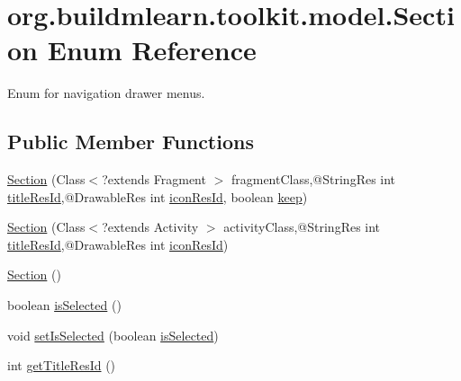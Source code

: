 \hypertarget{enumorg_1_1buildmlearn_1_1toolkit_1_1model_1_1Section}{}\section{org.\+buildmlearn.\+toolkit.\+model.\+Section Enum Reference}
\label{enumorg_1_1buildmlearn_1_1toolkit_1_1model_1_1Section}


Enum for navigation drawer menus.  


\subsection*{Public Member Functions}
\begin{DoxyCompactItemize}
\item 
\hyperlink{enumorg_1_1buildmlearn_1_1toolkit_1_1model_1_1Section_af8fb689a6421ec67519ee10df7ed87d9}{Section} (Class$<$?extends Fragment $>$ fragment\+Class,@String\+Res int \hyperlink{enumorg_1_1buildmlearn_1_1toolkit_1_1model_1_1Section_accd3e04504db3b956fb5d123ecdeca8a}{title\+Res\+Id},@Drawable\+Res int \hyperlink{enumorg_1_1buildmlearn_1_1toolkit_1_1model_1_1Section_ae100070151f5fec230914d56d01ac763}{icon\+Res\+Id}, boolean \hyperlink{enumorg_1_1buildmlearn_1_1toolkit_1_1model_1_1Section_a87db2a68da123249ea5d0dec338a2416}{keep})
\item 
\hyperlink{enumorg_1_1buildmlearn_1_1toolkit_1_1model_1_1Section_a07baca773badd3aad114bc1dbe9ac81b}{Section} (Class$<$?extends Activity $>$ activity\+Class,@String\+Res int \hyperlink{enumorg_1_1buildmlearn_1_1toolkit_1_1model_1_1Section_accd3e04504db3b956fb5d123ecdeca8a}{title\+Res\+Id},@Drawable\+Res int \hyperlink{enumorg_1_1buildmlearn_1_1toolkit_1_1model_1_1Section_ae100070151f5fec230914d56d01ac763}{icon\+Res\+Id})
\item 
\hyperlink{enumorg_1_1buildmlearn_1_1toolkit_1_1model_1_1Section_a061a1024b9dad8b98f087318b07c25ec}{Section} ()
\item 
boolean \hyperlink{enumorg_1_1buildmlearn_1_1toolkit_1_1model_1_1Section_a4cb0beec9f29165abfcbc67fde005f88}{is\+Selected} ()
\item 
void \hyperlink{enumorg_1_1buildmlearn_1_1toolkit_1_1model_1_1Section_aa51797a0f1021e6c5a5782c7518334eb}{set\+Is\+Selected} (boolean \hyperlink{enumorg_1_1buildmlearn_1_1toolkit_1_1model_1_1Section_a7b69e14d7f9a41cf17e54d3fe0703c28}{is\+Selected})
\item 
int \hyperlink{enumorg_1_1buildmlearn_1_1toolkit_1_1model_1_1Section_af9f688dd7dff001f5175eed3c1b95332}{get\+Title\+Res\+Id} ()

\end{DoxyCompactItemize}
